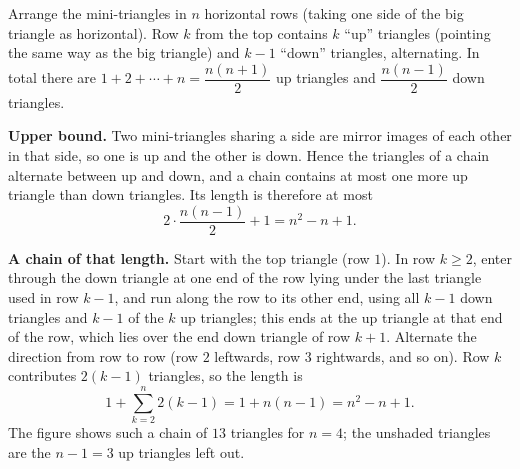 Arrange the mini-triangles in $n$ horizontal rows (taking one side of the big triangle as horizontal). Row $k$ from the top contains $k$ ``up'' triangles (pointing the same way as the big triangle) and $k-1$ ``down'' triangles, alternating. In total there are $1+2+\cdots+n=\dfrac{n(n+1)}{2}$ up triangles and $\dfrac{n(n-1)}{2}$ down triangles.

\textbf{Upper bound.} Two mini-triangles sharing a side are mirror images of each other in that side, so one is up and the other is down. Hence the triangles of a chain alternate between up and down, and a chain contains at most one more up triangle than down triangles. Its length is therefore at most
\[
2\cdot\dfrac{n(n-1)}{2}+1=n^2-n+1 .
\]

\textbf{A chain of that length.} Start with the top triangle (row $1$). In row $k\ge2$, enter through the down triangle at one end of the row lying under the last triangle used in row $k-1$, and run along the row to its other end, using all $k-1$ down triangles and $k-1$ of the $k$ up triangles; this ends at the up triangle at that end of the row, which lies over the end down triangle of row $k+1$. Alternate the direction from row to row (row $2$ leftwards, row $3$ rightwards, and so on). Row $k$ contributes $2(k-1)$ triangles, so the length is
\[
1+\sum_{k=2}^{n}2(k-1)=1+n(n-1)=n^2-n+1 .
\]
The figure shows such a chain of $13$ triangles for $n=4$; the unshaded triangles are the $n-1=3$ up triangles left out.

